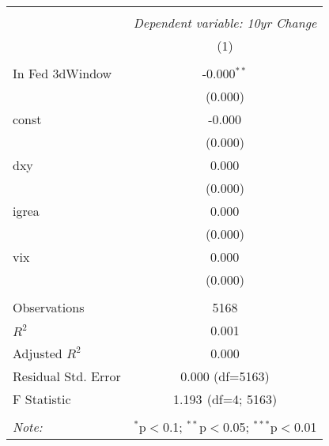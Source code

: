 \begin{table}[!htbp] \centering
\begin{tabular}{@{\extracolsep{5pt}}lc}
\\[-1.8ex]\hline
\hline \\[-1.8ex]
& \multicolumn{1}{c}{\textit{Dependent variable: 10yr Change}} \
\cr \cline{2-2}
\\[-1.8ex] & (1) \\
\hline \\[-1.8ex]
 In Fed 3dWindow & -0.000$^{**}$ \\
& (0.000) \\
 const & -0.000$^{}$ \\
& (0.000) \\
 dxy & 0.000$^{}$ \\
& (0.000) \\
 igrea & 0.000$^{}$ \\
& (0.000) \\
 vix & 0.000$^{}$ \\
& (0.000) \\
\hline \\[-1.8ex]
 Observations & 5168 \\
 $R^2$ & 0.001 \\
 Adjusted $R^2$ & 0.000 \\
 Residual Std. Error & 0.000 (df=5163) \\
 F Statistic & 1.193$^{}$ (df=4; 5163) \\
\hline
\hline \\[-1.8ex]
\textit{Note:} & \multicolumn{1}{r}{$^{*}$p$<$0.1; $^{**}$p$<$0.05; $^{***}$p$<$0.01} \\
\end{tabular}
\end{table}